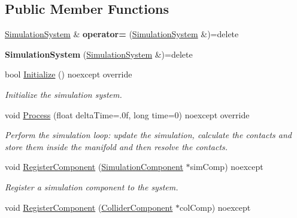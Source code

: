 \subsection*{Public Member Functions}
\begin{DoxyCompactItemize}
\item 
\mbox{\label{class_blade_1_1_simulation_system_a47e9db83aee131450f028cea185a0353}} 
\hyperlink{class_blade_1_1_simulation_system}{Simulation\+System} \& {\bfseries operator=} (\hyperlink{class_blade_1_1_simulation_system}{Simulation\+System} \&)=delete
\item 
\mbox{\label{class_blade_1_1_simulation_system_ad190fdcf46746653d25eba680ff67521}} 
{\bfseries Simulation\+System} (\hyperlink{class_blade_1_1_simulation_system}{Simulation\+System} \&)=delete
\item 
\mbox{\label{class_blade_1_1_simulation_system_a44ca3c7941497162d70f1e9e53b016f9}} 
bool \hyperlink{class_blade_1_1_simulation_system_a44ca3c7941497162d70f1e9e53b016f9}{Initialize} () noexcept override
\begin{DoxyCompactList}\small\item\em Initialize the simulation system. \end{DoxyCompactList}\item 
void \hyperlink{class_blade_1_1_simulation_system_ade81487a31325272e8489c772530ccf5}{Process} (float delta\+Time=.\+0f, long time=0) noexcept override
\begin{DoxyCompactList}\small\item\em Perform the simulation loop\+: update the simulation, calculate the contacts and store them inside the manifold and then resolve the contacts. \end{DoxyCompactList}\item 
void \hyperlink{class_blade_1_1_simulation_system_a638c4b8971944ab94cfda2c59a651665}{Register\+Component} (\hyperlink{class_blade_1_1_simulation_component}{Simulation\+Component} $\ast$sim\+Comp) noexcept
\begin{DoxyCompactList}\small\item\em Register a simulation component to the system. \end{DoxyCompactList}\item 
void \hyperlink{class_blade_1_1_simulation_system_ad1a98c60a727feba8899e57cacfbab70}{Register\+Component} (\hyperlink{class_blade_1_1_collider_component}{Collider\+Component} $\ast$col\+Comp) noexcept

\end{DoxyCompactItemize}
